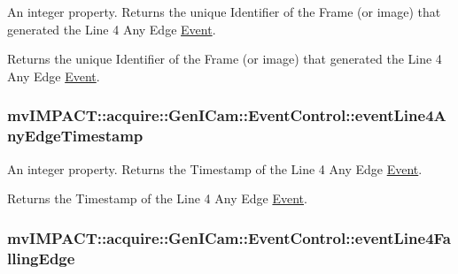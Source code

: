 An integer property. Returns the unique Identifier of the Frame (or image) that generated the Line 4 Any Edge \hyperlink{classmv_i_m_p_a_c_t_1_1acquire_1_1_event}{Event}. 

Returns the unique Identifier of the Frame (or image) that generated the Line 4 Any Edge \hyperlink{classmv_i_m_p_a_c_t_1_1acquire_1_1_event}{Event}. \hypertarget{classmv_i_m_p_a_c_t_1_1acquire_1_1_gen_i_cam_1_1_event_control_ac88fabc4a323fff0ed7779412b097548}{
\subsubsection[{event\+Line4\+Any\+Edge\+Timestamp}]{ mv\+I\+M\+P\+A\+C\+T\+::acquire\+::\+Gen\+I\+Cam\+::\+Event\+Control\+::event\+Line4\+Any\+Edge\+Timestamp}}\label{classmv_i_m_p_a_c_t_1_1acquire_1_1_gen_i_cam_1_1_event_control_ac88fabc4a323fff0ed7779412b097548}


An integer property. Returns the Timestamp of the Line 4 Any Edge \hyperlink{classmv_i_m_p_a_c_t_1_1acquire_1_1_event}{Event}. 

Returns the Timestamp of the Line 4 Any Edge \hyperlink{classmv_i_m_p_a_c_t_1_1acquire_1_1_event}{Event}. \hypertarget{classmv_i_m_p_a_c_t_1_1acquire_1_1_gen_i_cam_1_1_event_control_a61e4eed8bf85b7023674d9935897dea1}{
\subsubsection[{event\+Line4\+Falling\+Edge}]{ mv\+I\+M\+P\+A\+C\+T\+::acquire\+::\+Gen\+I\+Cam\+::\+Event\+Control\+::event\+Line4\+Falling\+Edge}}\label{classmv_i_m_p_a_c_t_1_1acquire_1_1_gen_i_cam_1_1_event_control_a61e4eed8bf85b7023674d9935897dea1}


